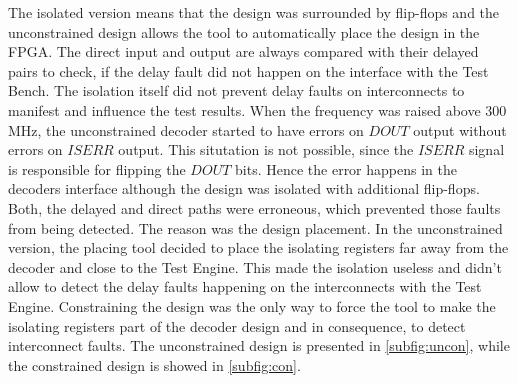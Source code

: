 The isolated version means that the design was surrounded by flip-flops and the unconstrained design allows the tool to automatically place the design in the FPGA. The direct input and output are always compared with their delayed pairs to check, if the delay fault did not happen on the interface with the Test Bench. The isolation itself did not prevent delay faults on interconnects to manifest and influence the test results. When the frequency was raised above 300 MHz, the unconstrained decoder started to have errors on $DOUT$ output without errors on $ISERR$ output. This situtation is not possible, since the $ISERR$ signal is responsible for flipping the $DOUT$ bits. Hence the error happens in the decoders interface although the design was isolated with additional flip-flops. Both, the delayed and direct paths were erroneous, which prevented those faults from being detected. The reason was the design placement. In the unconstrained version, the placing tool decided to place the isolating registers far away from the decoder and close to the Test Engine. This made the isolation useless and didn't allow to detect the delay faults happening on the interconnects with the Test Engine. Constraining the design was the only way to force the tool to make the isolating registers part of the decoder design and in consequence, to detect interconnect faults. The unconstrained design is presented in \autoref{subfig:uncon}, while the constrained design is showed in \autoref{subfig:con}.

